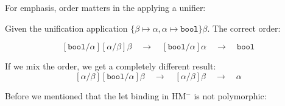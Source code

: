 \noindent
For emphasis, order matters in the applying a unifier:
\begin{Example}

    \noindent
    Given the unification application $\{\beta\mapsto\alpha,\alpha\mapsto\texttt{bool}\}\beta$. The correct order:

    $$
        [\texttt{bool}/\alpha][\alpha/\beta]\beta\quad\to\quad[\texttt{bool}/\alpha]\alpha\quad\to\quad\texttt{bool}
    $$

    \noindent
    If we mix the order, we get a completely different result:
    $$
        [\alpha/\beta][\texttt{bool}/\alpha]\beta\quad\to\quad [\alpha/\beta]\beta\quad\to\quad\alpha
    $$
\end{Example}

\newpage 

\noindent
Before we mentioned that the let binding in HM$^-$ is not polymorphic:
